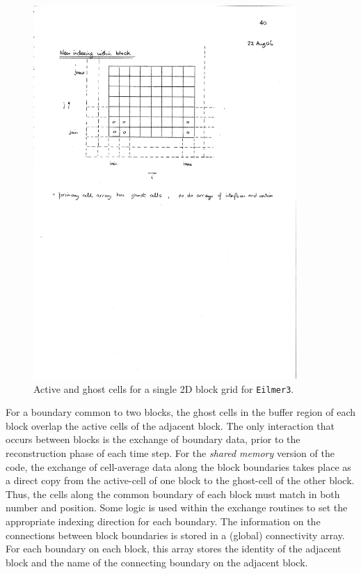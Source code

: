 \begin{figure}
   \centerline{ \includegraphics[width=10cm,viewport=48 316 295 509,clip=true]{figures/mbcns2-indexing-within-block.pdf} }
   \caption{Active and ghost cells for a single 2D block grid for \texttt{Eilmer3}.}
   \label{mbcns2-block-fig}
\end{figure}

\medskip
For a boundary common to two blocks, the ghost cells in the
buffer region of each block overlap the active cells of the adjacent block.
The only interaction that occurs between blocks is the 
exchange of boundary data, prior to the reconstruction phase of each time step.
For the \textit{shared memory} version of the code, 
the exchange of cell-average data along the block boundaries takes place as
a direct copy from the active-cell of one block to the ghost-cell of the other block.
Thus, the cells along the common boundary of each block must match in both number and position.
Some logic is used within the exchange routines to set the appropriate indexing direction for each boundary.
The information on the connections between block boundaries is stored in a (global) connectivity array.
For each boundary on each block, this array stores the
identity of the adjacent block and the name of the connecting boundary on the adjacent block.

